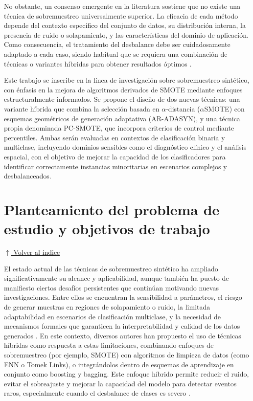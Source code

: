 \documentclass[12pt,a4paper]{article}
\begin{document}
No obstante, un consenso emergente en la literatura sostiene que no existe una técnica de sobremuestreo universalmente superior. La eficacia de cada método depende del contexto específico del conjunto de datos, su distribución interna, la presencia de ruido o solapamiento, y las características del dominio de aplicación. Como consecuencia, el tratamiento del desbalance debe ser cuidadosamente adaptado a cada caso, siendo habitual que se requiera una combinación de técnicas o variantes híbridas para obtener resultados óptimos \parencite{galar2012review, khorshidi2025synthetic}.

Este trabajo se inscribe en la línea de investigación sobre sobremuestreo sintético, con énfasis en la mejora de algoritmos derivados de SMOTE mediante enfoques estructuralmente informados. Se propone el diseño de dos nuevas técnicas: una variante híbrida que combina la selección basada en $ \alpha $-distancia ($ \alpha $SMOTE) con esquemas geométricos de generación adaptativa (AR-ADASYN), y una técnica propia denominada PC-SMOTE, que incorpora criterios de control mediante percentiles. Ambas serán evaluadas en contextos de clasificación binaria y multiclase, incluyendo dominios sensibles como el diagnóstico clínico y el análisis espacial, con el objetivo de mejorar la capacidad de los clasificadores para identificar correctamente instancias minoritarias en escenarios complejos y desbalanceados.


\section{Planteamiento del problema de estudio y objetivos de trabajo} \noindent\hyperlink{toc}{\small$\uparrow$ Volver al índice}

El estado actual de las técnicas de sobremuestreo sintético ha ampliado significativamente su alcance y aplicabilidad, aunque también ha puesto de manifiesto ciertos desafíos persistentes que continúan motivando nuevas investigaciones. Entre ellos se encuentran la sensibilidad a parámetros, el riesgo de generar muestras en regiones de solapamiento o ruido, la limitada adaptabilidad en escenarios de clasificación multiclase, y la necesidad de mecanismos formales que garanticen la interpretabilidad y calidad de los datos generados \parencite{nasaruddin2025smote, qiu2025vs}.
En este contexto, diversos autores han propuesto el uso de técnicas híbridas como respuesta a estas limitaciones, combinando enfoques de sobremuestreo (por ejemplo, SMOTE) con algoritmos de limpieza de datos (como ENN o Tomek Links), o integrándolos dentro de esquemas de aprendizaje en conjunto como boosting y bagging. Este enfoque híbrido permite reducir el ruido, evitar el sobreajuste y mejorar la capacidad del modelo para detectar eventos raros, especialmente cuando el desbalance de clases es severo \parencite{poddar2024approaches}.
\end{document}
